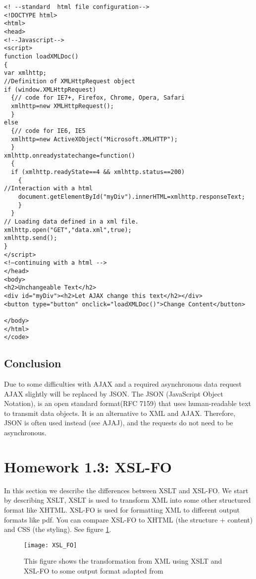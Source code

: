 \begin{lstlisting}
<! --standard  html file configuration-->
<!DOCTYPE html>
<html>
<head>
<!--Javascript-->
<script> 
function loadXMLDoc()
{
var xmlhttp;
//Definition of XMLHttpRequest object
if (window.XMLHttpRequest)
  {// code for IE7+, Firefox, Chrome, Opera, Safari
  xmlhttp=new XMLHttpRequest();
  }
else
  {// code for IE6, IE5
  xmlhttp=new ActiveXObject("Microsoft.XMLHTTP");
  }
xmlhttp.onreadystatechange=function()
  {
  if (xmlhttp.readyState==4 && xmlhttp.status==200)
    {
//Interaction with a html
    document.getElementById("myDiv").innerHTML=xmlhttp.responseText;
    }
  }
// Loading data defined in a xml file.
xmlhttp.open("GET","data.xml",true);
xmlhttp.send();
}
</script>
<!—continuing with a html -->
</head>
<body>
<h2>Unchangeable Text</h2> 
<div id="myDiv"><h2>Let AJAX change this text</h2></div>
<button type="button" onclick="loadXMLDoc()">Change Content</button>

</body>
</html>
</code>

\end{lstlisting}
\subsection{Conclusion}
Due to some difficulties with AJAX and a required asynchronous data request AJAX slightly will be replaced by JSON.
The JSON (JavaScript Object Notation), is an open standard format(RFC 7159) that uses human-readable text to transmit data objects. It is an alternative to XML and AJAX. Therefore, JSON is often used instead (see AJAJ), and the requests do not need to be asynchronous.\cite {wk02}

\newpage

\section[Homework 1.3]{Homework 1.3: XSL-FO}

In this section we describe the differences between XSLT and XSL-FO. We start by describing XSLT, XSLT is used to transform XML into some other structured format like XHTML. XSL-FO is used for formatting XML to different output formats like pdf. You can compare XSL-FO to XHTML (the structure + content) and CSS (the styling). See figure \ref{fig:XSL}.

\begin{figure}[H]
	\centering
	\texttt{[image: XSL\_FO]}
	\caption{This figure shows the transformation from XML using XSLT and XSL-FO to some output format adapted from \cite{XSL-FO}}
	\label{fig:XSL}
\end{figure}
